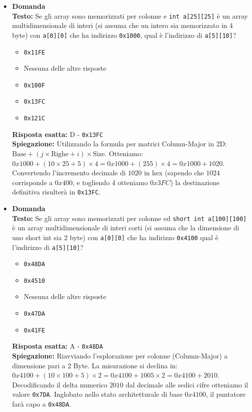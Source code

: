 \documentclass[12pt, a4paper]{article}
\newcounter{domandateoria}
\begin{document}
\begin{itemize}
\newpage

\item {}\textbf{Domanda \thedomandateoria} \\
\textbf{Testo:} Se gli array sono memorizzati per colonne e \texttt{int a[25][25]} è un array multidimensionale di interi (si assuma che un intero sia memorizzato in 4 byte) con \texttt{a[0][0]} che ha indirizzo \texttt{0x1000}, qual è l'indirizzo di \texttt{a[5][10]}?
\begin{itemize}
    \item[A)] \texttt{0x11FE}
    \item[B)] Nessuna delle altre risposte
    \item[C)] \texttt{0x100F}
    \item[D)] \texttt{0x13FC}
    \item[E)] \texttt{0x121C}
\end{itemize}
\textbf{Risposta esatta:} D - \texttt{0x13FC} \\
\textbf{Spiegazione:} Utilizzando la formula per matrici Column-Major in 2D: $\text{Base} + (j \times \text{Righe} + i) \times \text{Size}$.
Otteniamo: $0x1000 + (10 \times 25 + 5) \times 4 = 0x1000 + (255) \times 4 = 0x1000 + 1020$.
Convertendo l'incremento decimale di $1020$ in hex (sapendo che $1024$ corrisponde a $0x400$, e togliendo 4 otteniamo $0x3FC$) la destinazione definitiva risulterà in \texttt{0x13FC}.
\vspace{0.3cm}


\item {}\textbf{Domanda \thedomandateoria} \\
\textbf{Testo:} Se gli array sono memorizzati per colonne ed \texttt{short int a[100][100]} è un array multidimensionale di interi corti (si assuma che la dimensione di uno short int sia 2 byte) con \texttt{a[0][0]} che ha indirizzo \texttt{0x4100} qual è l'indirizzo di \texttt{a[5][10]}?
\begin{itemize}
    \item[A)] \texttt{0x48DA}
    \item[B)] \texttt{0x4510}
    \item[C)] Nessuna delle altre risposte
    \item[D)] \texttt{0x47DA}
    \item[E)] \texttt{0x41FE}
\end{itemize}
\textbf{Risposta esatta:} A - \texttt{0x48DA} \\
\textbf{Spiegazione:} Riavviando l'esplorazione per colonne (Column-Major) a dimensione pari a 2 Byte. 
La misurazione si declina in: $0x4100 + (10 \times 100 + 5) \times 2 = 0x4100 + 1005 \times 2 = 0x4100 + 2010$.
Decodificando il delta numerico $2010$ dal decimale alle sedici cifre otteniamo il valore \texttt{0x7DA}. Inglobato nello stato architetturale di base $0x4100$, il puntatore farà capo a \texttt{0x48DA}.
\vspace{0.3cm}
\end{itemize}
\end{document}
